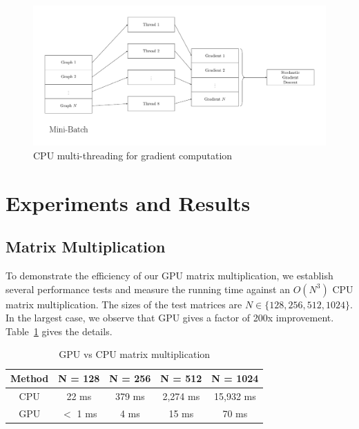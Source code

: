 \documentclass[a4paper]{article}
\begin{document}
\begin{figure}[h]
\caption{CPU multi-threading for gradient computation}
\label{fig:CPU_multithreading}
\includegraphics[width=\columnwidth]{CPU_box_flow}
\end{figure}

\section{Experiments and Results}

\subsection{Matrix Multiplication}

To demonstrate the efficiency of our GPU matrix multiplication, we establish several performance tests and measure the running time against an $O(N^3)$ CPU matrix multiplication. The sizes of the test matrices are $N \in \{128, 256, 512, 1024\}$. In the largest case, we observe that GPU gives a factor of 200x improvement. Table~\ref{tab:matrix_mult} gives the details.

\begin{table}[h]
\begin{tabular}{||c | c | c | c | c ||}
	\hline
	Method & N = 128 & N = 256 & N = 512 & N = 1024 \\
	\hline\hline
	CPU & 22 ms & 379 ms & 2,274 ms & 15,932 ms \\
	\hline
	GPU & $<$ 1 ms & 4 ms & 15 ms & 70 ms \\
	\hline
\end{tabular}
\caption{GPU vs CPU matrix multiplication}\label{tab:matrix_mult}
\end{table}
\end{document}
